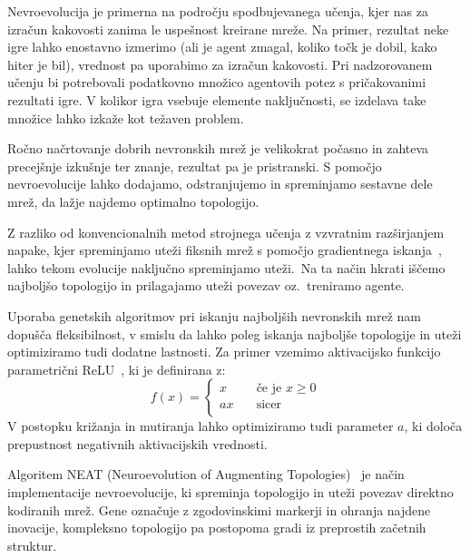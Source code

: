 \documentclass[a4paper,12pt,openright]{book}
\begin{document}
    Nevroevolucija je primerna na področju spodbujevanega učenja, kjer nas za izračun kakovosti zanima le uspešnost
    kreirane mreže.
    Na primer, rezultat neke igre lahko enostavno izmerimo (ali je agent zmagal, koliko točk je dobil, kako hiter je bil),
    vrednost pa uporabimo za izračun kakovosti.
    Pri nadzorovanem učenju bi potrebovali podatkovno množico agentovih potez s pričakovanimi rezultati igre.
    V kolikor igra vsebuje elemente naključnosti, se izdelava take množice lahko izkaže kot težaven problem.

    Ročno načrtovanje dobrih nevronskih mrež je velikokrat počasno in zahteva precejšnje izkušnje ter znanje, rezultat pa
    je pristranski.
    S pomočjo nevroevolucije lahko dodajamo, odstranjujemo in spreminjamo sestavne dele mrež, da lažje najdemo optimalno topologijo.

    Z razliko od konvencionalnih metod strojnega učenja z vzvratnim raz\-šir\-ja\-njem napake, kjer spreminjamo uteži
    fiksnih mrež s pomočjo gradientnega iskanja~\cite{inteligentni_sistemi_2010}, lahko tekom evolucije naključno
    spreminjamo uteži.\ Na ta način hkrati iščemo najboljšo topologijo in prilagajamo uteži povezav oz.\ treniramo agente.

    Uporaba genetskih algoritmov pri iskanju najboljših nevronskih mrež nam dopušča fleksibilnost, v smislu da lahko poleg
    iskanja najboljše topologije in uteži optimiziramo tudi dodatne lastnosti.
    Za primer vzemimo aktivacijsko funkcijo parametrični ReLU~\cite{he2015delving}, ki je definirana z:
    \begin{equation}
        f(x)=
        \begin{cases}
            x & \quad\text{če je } x\ge0\\
            ax & \quad\text{sicer}\\
        \end{cases}
        \label{eq:parametric_relu}
    \end{equation}
    V postopku križanja in mutiranja lahko optimiziramo tudi parameter $a$, ki določa prepustnost negativnih aktivacijskih vrednosti.

    Algoritem NEAT (Neuroevolution of Augmenting Topologies)~\cite{enwiki:1179705451,Iba_2018} je način implementacije nevroevolucije, ki spreminja topologijo in uteži povezav direktno kodiranih mrež.
    Gene označuje z zgodovinskimi markerji in ohranja najdene inovacije, kompleksno topologijo pa postopoma gradi iz preprostih začetnih struktur.
\end{document}
